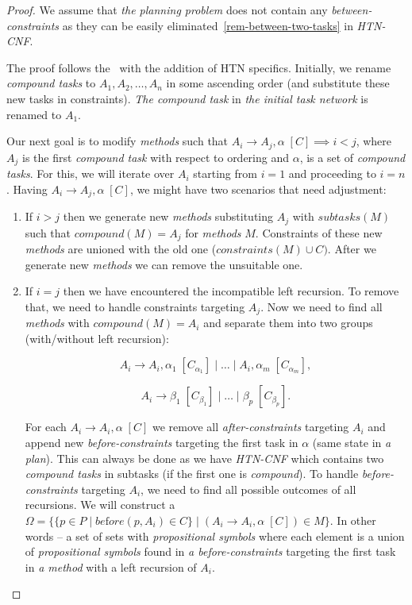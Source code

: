 \begin{proof}
    We assume that \emph{the planning problem} does not contain any \emph{between-constraints} as they can be easily eliminated~\ref{rem-between-two-tasks} in \emph{HTN-CNF}.

    The proof follows the~\cite{gnf_bartak} with the addition of HTN specifics. Initially, we rename \emph{compound tasks} to $A_1, A_2, \dots, A_n$ in some ascending order (and substitute these new tasks in constraints). \emph{The compound task} in \emph{the initial task network} is renamed to $A_1$. 
    
    Our next goal is to modify \emph{methods} such that $A_i \rightarrow A_j, \alpha \; [C] \implies i < j$, where $A_j$ is the first \emph{compound task} with respect to ordering and $\alpha$, is a set of \emph{compound tasks}. For this, we will iterate over $A_i$ starting from $i = 1$ and proceeding to $i = n$. Having $A_i \rightarrow A_j, \alpha \; [C]$, we might have two scenarios that need adjustment:

    \begin{enumerate}
        \item If $i > j$ then we generate new \emph{methods} substituting $A_j$ with $subtasks(M)$ such that $compound(M) = A_j$ for \emph{methods} $M$. Constraints of these new \emph{methods} are unioned with the old one ($constraints(M) \cup C)$. After we generate new \emph{methods} we can remove the unsuitable one.

        \item If $i = j$ then we have encountered the incompatible left recursion. To remove that, we need to handle constraints targeting $A_j$. Now we need to find all \emph{methods} with $compound(M) = A_i$ and separate them into two groups (with/without left recursion):

        \[
            A_i \rightarrow A_i, \alpha_1 \; [C_{\alpha_1}] \; | \; \dots \; | \; A_i, \alpha_m \; [C_{\alpha_m}],
        \]
    
        \[
            A_i \rightarrow \beta_1 \; [C_{\beta_1}] \; | \; \dots \; | \; \beta_p \; [C_{\beta_p}].
        \]

        For each $A_i \rightarrow A_i, \alpha \; [C]$ we remove all \emph{after-constraints} targeting $A_i$ and append new \emph{before-constraints} targeting the first task in $\alpha$ (same state in \emph{a plan}). This can always be done as we have \emph{HTN-CNF} which contains two \emph{compound tasks} in subtasks (if the first one is \emph{compound}). To handle \emph{before-constraints} targeting $A_i$, we need to find all possible outcomes of all recursions. We will construct a $\Omega = \{\{ p \in P \; | \; be\text{f}ore(p, A_i) \in C\} \; | \; (A_i \rightarrow A_i, \alpha \; [C]) \in M \}$. In other words – a set of sets with \emph{propositional symbols} where each element is a union of \emph{propositional symbols} found in \emph{a before-constraints} targeting the first task in \emph{a method} with a left recursion of $A_i$.


\end{enumerate}
\end{proof}

